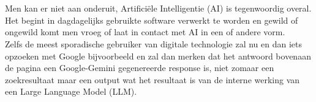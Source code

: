
\chapter{}%
\label{ch:inleiding}

Men kan er niet aan onderuit, Artificiële Intelligentie (AI) is tegenwoordig overal. Het begint in dagdagelijks gebruikte software verwerkt te worden en gewild of ongewild komt men vroeg of laat in contact met AI in een of andere vorm. \\

Zelfs de meest sporadische gebruiker van digitale technologie zal nu en dan iets opzoeken met Google bijvoorbeeld en zal dan merken dat het antwoord bovenaan de pagina een Google-Gemini gegenereerde response is, niet zomaar een zoekresultaat maar een output wat het resultaat is van de interne werking van een Large Language Model (LLM). \\

